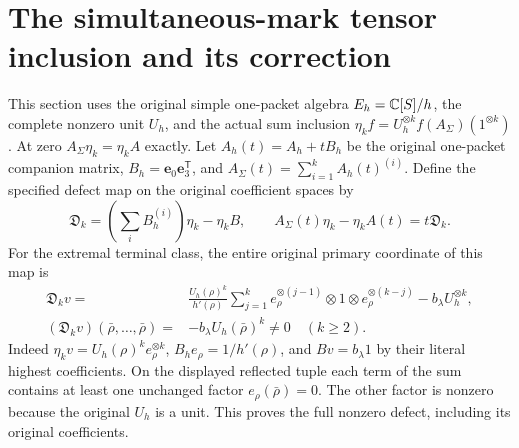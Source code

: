 \section{The simultaneous-mark tensor inclusion and its correction}
This section uses the original simple one-packet algebra
$E_h=\mathbb C[S]/h$, the complete nonzero unit $U_h$, and the actual
sum inclusion
$\eta_k f=U_h^{\otimes k}f(A_\Sigma)(1^{\otimes k})$.
At zero $A_\Sigma\eta_k=\eta_k A$ exactly. Let
$A_h(t)=A_h+tB_h$ be the original one-packet companion matrix,
$B_h=\mathbf e_0\mathbf e_3^{\mathsf T}$, and
$A_\Sigma(t)=\sum_{i=1}^k A_h(t)^{(i)}$.
Define the specified defect map on the original coefficient spaces by
\begin{equation}\tag{MAR23}\label{a02mar:mar:tensordefect}
 \mathfrak D_k=\left(\sum_iB_h^{(i)}\right)\eta_k-\eta_k B,
 \qquad A_\Sigma(t)\eta_k-\eta_k A(t)=t\mathfrak D_k.
\end{equation}
For the extremal terminal class, the entire original primary
coordinate of this map is
\begin{equation}\tag{MAR24}\label{a02mar:mar:Dv}
 \begin{aligned}
 \mathfrak D_kv={}&\frac{U_h(\rho)^k}{h'(\rho)}
 \sum_{j=1}^k e_\rho^{\otimes(j-1)}\otimes1
                         \otimes e_\rho^{\otimes(k-j)}
                 -b_\lambda U_h^{\otimes k},\\
 (\mathfrak D_kv)(\bar\rho,\ldots,\bar\rho)
       ={}&-b_\lambda U_h(\bar\rho)^k\ne0\quad(k\ge2).
 \end{aligned}
\end{equation}
Indeed $\eta_kv=U_h(\rho)^ke_\rho^{\otimes k}$,
$B_he_\rho=1/h'(\rho)$, and $Bv=b_\lambda1$ by their literal
highest coefficients. On the displayed reflected tuple each
term of the sum contains at least one unchanged factor
$e_\rho(\bar\rho)=0$. The other factor is nonzero because the
original $U_h$ is a unit. This proves the full nonzero defect,
including its original coefficients.

